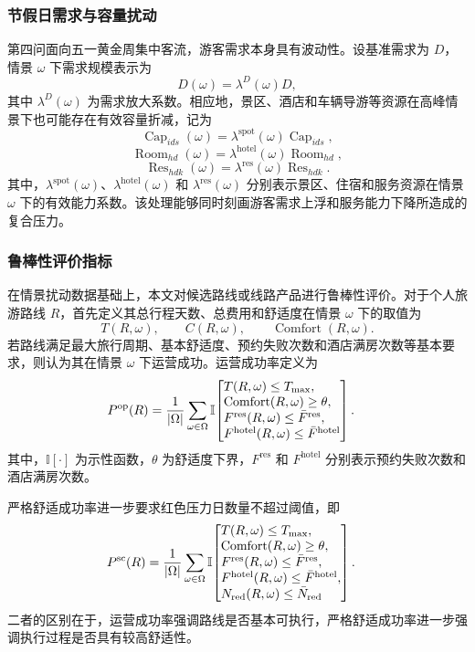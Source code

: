 \documentclass[UTF8,zihao=-4,a4paper]{ctexart}
\begin{document}
\subsubsection{节假日需求与容量扰动}

第四问面向五一黄金周集中客流，游客需求本身具有波动性。设基准需求为 $D$，情景 $\omega$ 下需求规模表示为
\[
D(\omega)=\lambda^{D}(\omega)D,
\]
其中 $\lambda^{D}(\omega)$ 为需求放大系数。相应地，景区、酒店和车辆导游等资源在高峰情景下也可能存在有效容量折减，记为
\[
\operatorname{Cap}_{ids}(\omega)
=
\lambda^{\mathrm{spot}}(\omega)\operatorname{Cap}_{ids},
\]
\[
\operatorname{Room}_{hd}(\omega)
=
\lambda^{\mathrm{hotel}}(\omega)\operatorname{Room}_{hd},
\]
\[
\operatorname{Res}_{hdk}(\omega)
=
\lambda^{\mathrm{res}}(\omega)\operatorname{Res}_{hdk}.
\]
其中，$\lambda^{\mathrm{spot}}(\omega)$、$\lambda^{\mathrm{hotel}}(\omega)$ 和 $\lambda^{\mathrm{res}}(\omega)$ 分别表示景区、住宿和服务资源在情景 $\omega$ 下的有效能力系数。该处理能够同时刻画游客需求上浮和服务能力下降所造成的复合压力。

\subsubsection{鲁棒性评价指标}

在情景扰动数据基础上，本文对候选路线或线路产品进行鲁棒性评价。对于个人旅游路线 $R$，首先定义其总行程天数、总费用和舒适度在情景 $\omega$ 下的取值为
\[
T(R,\omega),\qquad
C(R,\omega),\qquad
\operatorname{Comfort}(R,\omega).
\]
若路线满足最大旅行周期、基本舒适度、预约失败次数和酒店满房次数等基本要求，则认为其在情景 $\omega$ 下运营成功。运营成功率定义为
\[
\begin{aligned}
P^{\mathrm{op}}(R)
&=
\frac{1}{|\Omega|}
\sum_{\omega\in\Omega}
\mathbb{I}\!\left[
\begin{array}{@{}l@{}}
T(R,\omega)\leq T_{\max},\\
\operatorname{Comfort}(R,\omega)\geq \theta,\\
F^{\mathrm{res}}(R,\omega)\leq \bar{F}^{\mathrm{res}},\\
F^{\mathrm{hotel}}(R,\omega)\leq \bar{F}^{\mathrm{hotel}}
\end{array}
\right].
\end{aligned}
\]
其中，$\mathbb{I}[\cdot]$ 为示性函数，$\theta$ 为舒适度下界，$F^{\mathrm{res}}$ 和 $F^{\mathrm{hotel}}$ 分别表示预约失败次数和酒店满房次数。

严格舒适成功率进一步要求红色压力日数量不超过阈值，即
\[
\begin{aligned}
P^{\mathrm{sc}}(R)
&=
\frac{1}{|\Omega|}
\sum_{\omega\in\Omega}
\mathbb{I}\!\left[
\begin{array}{@{}l@{}}
T(R,\omega)\leq T_{\max},\\
\operatorname{Comfort}(R,\omega)\geq \theta,\\
F^{\mathrm{res}}(R,\omega)\leq \bar{F}^{\mathrm{res}},\\
F^{\mathrm{hotel}}(R,\omega)\leq \bar{F}^{\mathrm{hotel}},\\
N_{\mathrm{red}}(R,\omega)\leq \bar{N}_{\mathrm{red}}
\end{array}
\right].
\end{aligned}
\]
二者的区别在于，运营成功率强调路线是否基本可执行，严格舒适成功率进一步强调执行过程是否具有较高舒适性。
\end{document}

